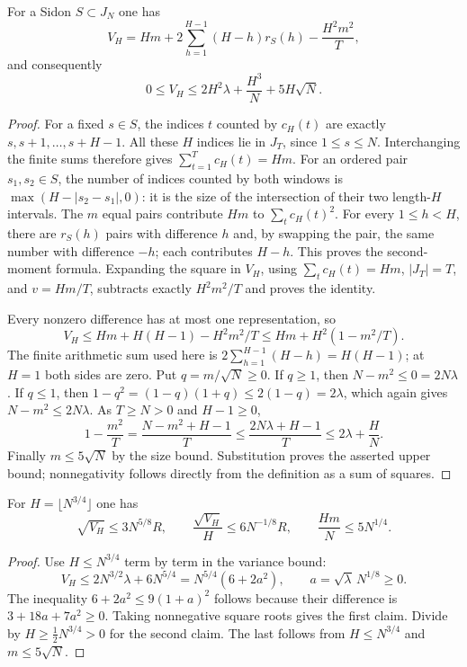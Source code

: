 \begin{lemma}
\label{core:window-variance-bound}
For a Sidon $S\subset J_N$ one has
\[
 V_H=Hm+2\sum_{h=1}^{H-1}(H-h)r_S(h)-\frac{H^2m^2}{T},
\]
and consequently
\[
 0\leq V_H\leq 2H^2\lambda+\frac{H^3}{N}+5H\sqrt N.
\]
\end{lemma}
\begin{proof}
For a fixed $s\in S$, the indices $t$ counted by $c_H(t)$ are
exactly $s,s+1,\ldots,s+H-1$.  All these $H$ indices lie in $J_T$,
since $1\leq s\leq N$.  Interchanging the finite sums therefore
gives $\sum_{t=1}^T c_H(t)=Hm$.
For an ordered pair $s_1,s_2\in S$, the number of indices counted
by both windows is $\max(H-|s_2-s_1|,0)$: it is the size of the
intersection of their two length-$H$ intervals.  The $m$ equal
pairs contribute $Hm$ to $\sum_t c_H(t)^2$.  For every
$1\leq h<H$, there are $r_S(h)$ pairs with difference $h$ and,
by swapping the pair, the same number with difference $-h$;
each contributes $H-h$.  This proves the second-moment formula.
Expanding the square in $V_H$, using $\sum_t c_H(t)=Hm$,
$|J_T|=T$, and $v=Hm/T$, subtracts exactly $H^2m^2/T$ and
proves the identity.

Every nonzero difference has at most one representation, so
\[
 V_H\leq Hm+H(H-1)-H^2m^2/T
      \leq Hm+H^2(1-m^2/T).
\]
The finite arithmetic sum used here is
$2\sum_{h=1}^{H-1}(H-h)=H(H-1)$; at $H=1$ both sides are zero.
Put $q=m/\sqrt N\geq0$.  If $q\geq1$, then
$N-m^2\leq0=2N\lambda$.  If $q\leq1$, then
$1-q^2=(1-q)(1+q)\leq2(1-q)=2\lambda$, which again gives
$N-m^2\leq2N\lambda$.  As $T\geq N>0$ and $H-1\geq0$,
\[
 1-\frac{m^2}{T}
 =\frac{N-m^2+H-1}{T}
 \leq\frac{2N\lambda+H-1}{T}
 \leq2\lambda+\frac HN.
\]
Finally $m\leq5\sqrt N$ by the size bound.  Substitution proves
the asserted upper bound; nonnegativity follows directly from
the definition as a sum of squares.
\end{proof}

\begin{lemma}
\label{core:optimized-variance}
For $H=\lfloor N^{3/4}\rfloor$ one has
\[
 \sqrt{V_H}\leq3N^{5/8}R,\qquad
 \frac{\sqrt{V_H}}H\leq6N^{-1/8}R,\qquad
 \frac{Hm}{N}\leq5N^{1/4}.
\]
\end{lemma}
\begin{proof}
Use $H\leq N^{3/4}$ term by term in the variance bound:
\[
 V_H\leq2N^{3/2}\lambda+6N^{5/4}
       =N^{5/4}(6+2a^2),\qquad a=\sqrt\lambda\,N^{1/8}\geq0.
\]
The inequality $6+2a^2\leq9(1+a)^2$ follows because their
difference is $3+18a+7a^2\geq0$.  Taking nonnegative square
roots gives the first claim.  Divide by
$H\geq\frac12N^{3/4}>0$ for the second claim.  The last follows
from $H\leq N^{3/4}$ and $m\leq5\sqrt N$.
\end{proof}

